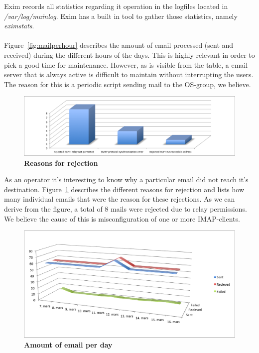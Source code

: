 Exim records all statistics regarding it operation in the logfiles
located in \emph{/var/log/mainlog}. Exim has a built in tool to gather
those statistics, namely \emph{eximstats}.\\\\
Figure~\ref{fig:mailperhour}  describes the amount of email processed (sent
and received) during the different hours of the days. This is highly
relevant in order to pick a good time for maintenance. However, as is
visible from the table, a email server that is always active is
difficult to maintain without interrupting the users. The reason for
this is a periodic script sending mail to the OS-group, we believe.
\begin{figure}[htb]
  \begin{center}
    \includegraphics[scale=0.55]{img/rejection-reasons.png}
  \end{center}
  \caption{\bf{Reasons for rejection}}
  \label{fig:rejection}
\end{figure}
As an operator it's interesting to know why a particular email did not
reach it's destination. Figure~\ref{fig:rejection} describes the
different reasons for rejection and lists how many individual emails
that were the reason for these rejections. As we can derive from the
figure, a total of 8 mails were rejected due to relay permissions. We
believe the cause of this is misconfiguration of one or more
IMAP-clients.
\begin{figure}[h!]
  \begin{center}
    \includegraphics[scale=0.70]{img/sent-received-failed.png}
  \end{center}
  \caption{\bf{Amount of email per day}}
  \label{fig:amount}
\end{figure}

